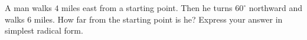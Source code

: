 A man walks $4$ miles east from a starting point. Then he turns $60^\circ$ northward and walks $6$ miles. How far from the starting point is he? Express your answer in simplest radical form.
